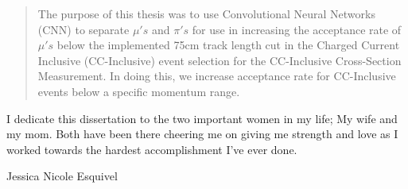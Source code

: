 
\begin{abstract}%
The purpose of this thesis was to use Convolutional Neural Networks (CNN) to separate $\mu'{s}$ and $\pi'{s}$ for use in increasing the acceptance rate of $\mu'{s}$ below the implemented 75cm track length cut in the Charged Current Inclusive (CC-Inclusive) event selection for the CC-Inclusive Cross-Section Measurement. In doing this, we increase acceptance rate for CC-Inclusive events below a specific momentum range.
\end{abstract}
\let\cleardoublepage\clearpage
\begin{declaration}
  I dedicate this dissertation to the two important women in my life; My wife and my mom. Both have been there cheering me on giving me strength and love as I worked towards the hardest accomplishment I've ever done.  
  \vspace*{1cm}
  \begin{flushright}
    Jessica Nicole Esquivel 
  \end{flushright}
\end{declaration}



